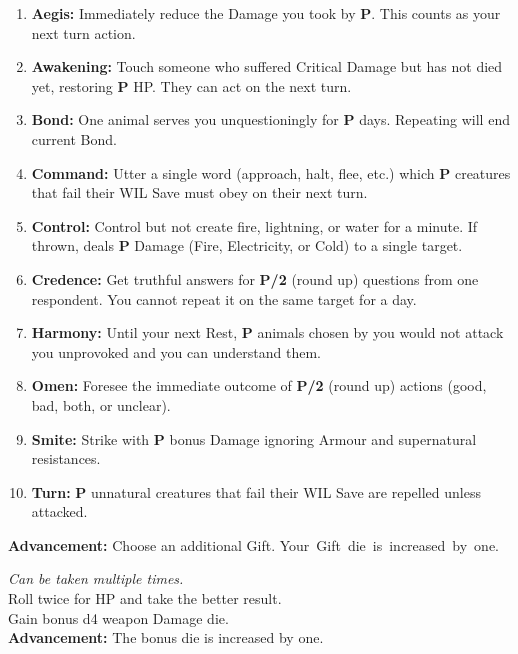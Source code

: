 \documentclass[itdr]{subfiles}
\begin{document}
\begin{enumerate}
	\item \textbf{Aegis:} Immediately reduce the Damage you took by \textbf{P}. This counts as your next turn action.
	\item \textbf{Awakening:} Touch someone who suffered \mbox{Critical} Damage but has not died yet, restoring \textbf{P} HP. They can act on the next turn.
	\item \textbf{Bond:} One animal serves you unquestioningly for \textbf{P} days. Repeating will end current Bond.
	\item \textbf{Command:} Utter a single word (approach, halt, flee, etc.) which \textbf{P} creatures that fail their WIL Save must obey on their next turn.
	\item \textbf{Control:} Control but not create fire, lightning, or water for a minute. If thrown, deals \textbf{P} Damage (Fire, Electricity, or Cold) to a single target.
	\item \textbf{Credence:} Get truthful answers for \textbf{P/2} (round up) questions from one respondent. You cannot repeat it on the same target for a day.
	\item \textbf{Harmony:} Until your next Rest, \textbf{P} animals chosen by you would not attack you unprovoked and you can understand them.
	\item \textbf{Omen:} Foresee the immediate outcome of \textbf{P/2} (round up) actions (good, bad, both, or unclear).
	\item \textbf{Smite:} Strike with \textbf{P} bonus Damage ignoring Armour and supernatural resistances.
	\item \textbf{Turn:} \textbf{P} unnatural creatures that fail their WIL Save are repelled unless attacked.
\end{enumerate}

\textbf{Advancement:} Choose an additional Gift. \mbox{Your Gift die is increased by one.}

\vfill
{} {\slshape Can be taken multiple times.}\\
Roll twice for HP and take the better result.\\
Gain bonus d4 weapon Damage die.\\
\textbf{Advancement:} The bonus die is increased by one.

\vfill

\vfill
{}
\vfill
\end{document}
